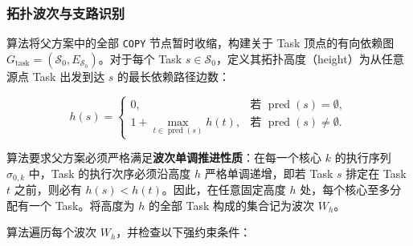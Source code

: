 \documentclass[anonymous,withtoc]{gmcm2026}
\begin{document}
\subsubsection{拓扑波次与支路识别}

算法将父方案中的全部 \texttt{COPY} 节点暂时收缩，构建关于 Task 顶点的有向依赖图 \(G_{\mathrm{task}} = (\mathcal{S}_0, E_{\mathcal{S}_0})\)。对于每个 Task \(s \in \mathcal{S}_0\)，定义其拓扑高度（height）为从任意源点 Task 出发到达 \(s\) 的最长依赖路径边数：

\begin{equation}
h(s) = \begin{cases} 0, & \text{若 } \operatorname{pred}(s) = \emptyset, \\ 1 + \max_{t \in \operatorname{pred}(s)} h(t), & \text{若 } \operatorname{pred}(s) \ne \emptyset. \end{cases}
\end{equation}

算法要求父方案必须严格满足\textbf{波次单调推进性质}：在每一个核心 \(k\) 的执行序列 \(\sigma_{0,k}\) 中，Task 的执行次序必须沿高度 \(h\) 严格单调递增，即若 Task \(s\) 排定在 Task \(t\) 之前，则必有 \(h(s) < h(t)\)。因此，在任意固定高度 \(h\) 处，每个核心至多分配有一个 Task。将高度为 \(h\) 的全部 Task 构成的集合记为波次 \(W_h\)。

算法遍历每个波次 \(W_h\)，并检查以下强约束条件：
\end{document}
